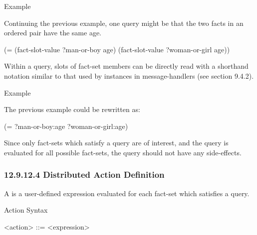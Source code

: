 \documentclass[letterpaper,10pt,english]{sphinxmanual}
\begin{document}

\begin{sphinxVerbatim}[commandchars=\\\{\}]
  
\end{sphinxVerbatim}

Example

Continuing the previous example, one query might be that the two facts
in an ordered pair have the same age.

(= (fact-slot-value ?man-or-boy age) (fact-slot-value ?woman-or-girl
age))

Within a query, slots of fact-set members can be directly read with a
shorthand notation similar to that used by instances in message-handlers
(see section 9.4.2).


\begin{sphinxVerbatim}[commandchars=\\\{\}]
\end{sphinxVerbatim}

Example

The previous example could be rewritten as:

(= ?man-or-boy:age ?woman-or-girl:age)

Since only fact-sets which satisfy a query are of interest, and the
query is evaluated for all possible fact-sets, the query should not have
any side-effects.


\subsubsection{12.9.12.4 Distributed Action Definition}
\label{\detokenize{actions:distributed-action-definition}}\label{\detokenize{actions:distributed-action-definition-1}}
A  is a user-defined expression evaluated for each
fact-set which satisfies a query.

Action Syntax

\textless{}action\textgreater{} ::= \textless{}expression\textgreater{}
\end{document}
